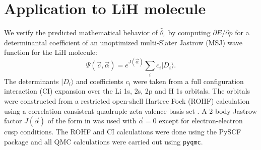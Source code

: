 \documentclass[twocolumn]{revtex4-1}
\begin{document}
\section{Application to LiH molecule}
We verify the predicted mathematical behavior of $\hat{\theta}_\epsilon$ by computing $\partial E/\partial p$ for a determinantal coefficient of an unoptimized multi-Slater Jastrow (MSJ) wave function for the LiH molecule:
\begin{equation}
\Psi(\vec{c}, \vec{\alpha}) = e^{J(\vec{\alpha})} \sum_{i} c_i  |D_i \rangle.
\end{equation}
The determinants $|D_i \rangle$ and coefficients $c_i$ were taken from a full configuration interaction (CI) expansion over the Li 1s, 2s, 2p and H 1s orbitals.
The orbitals were constructed from a restricted open-shell Hartree Fock (ROHF) calculation using a correlation consistent quadruple-zeta valence basis set \cite{doi:10.1063/1.456153}.
A 2-body Jastrow factor $J(\vec{\alpha})$ of the form in \cite{Wagner2009} was used with $\vec{\alpha} = 0$ except for electron-electron cusp conditions.
The ROHF and CI calculations were done using the PySCF package \cite{PYSCF} and all QMC calculations were carried out using \texttt{pyqmc}\cite{pyqmc}.
\end{document}
